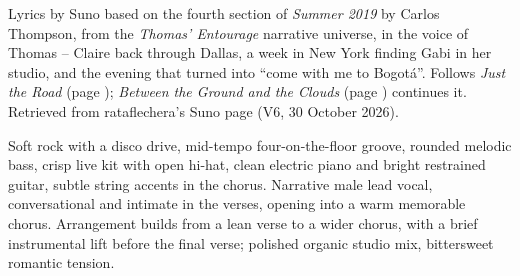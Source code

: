 
\label{sec:going-with-the-tenderness}
\begin{notes}
Lyrics by Suno based on the fourth section of \emph{Summer 2019} by Carlos Thompson, from the \emph{Thomas' Entourage} narrative universe, in the voice of Thomas -- Claire back through Dallas, a week in New York finding Gabi in her studio, and the evening that turned into ``come with me to Bogotá''. Follows \emph{Just the Road} (page \pageref{sec:just-the-road}); \emph{Between the Ground and the Clouds} (page \pageref{sec:between-the-ground-and-the-clouds}) continues it. Retrieved from rataflechera's Suno page (V6, 30 October 2026).
\end{notes}
\begin{style}
Soft rock with a disco drive, mid-tempo four-on-the-floor groove, rounded melodic bass, crisp live kit with open hi-hat, clean electric piano and bright restrained guitar, subtle string accents in the chorus. Narrative male lead vocal, conversational and intimate in the verses, opening into a warm memorable chorus. Arrangement builds from a lean verse to a wider chorus, with a brief instrumental lift before the final verse; polished organic studio mix, bittersweet romantic tension.
\end{style}
